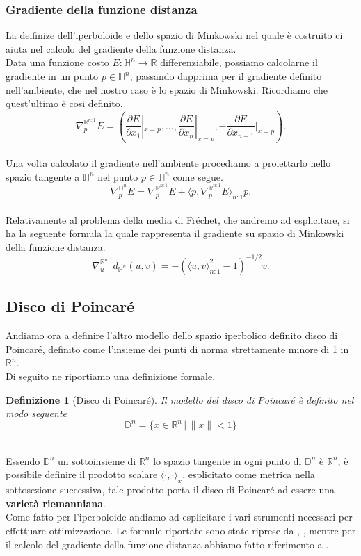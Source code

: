 \documentclass[a4paper, 12pt]{article}
\newtheorem{definition}{Definizione}
\begin{document}
\subsubsection{Gradiente della funzione distanza}
La deifinize dell'iperboloide e dello spazio di Minkowski nel quale è costruito ci aiuta nel calcolo del gradiente della funzione distanza.\\
Data una funzione costo $E:\mathbb{H}^n \to \mathbb{R}$ differenziabile, possiamo calcolarne il gradiente in un punto $p \in \mathbb{H}^n$, passando dapprima per il gradiente definito nell'ambiente, che nel nostro caso è lo spazio di Minkowski. Ricordiamo che quest'ultimo è cosi definito.\\
\[\nabla_{p}^{\mathbb{R}^{n:1}} E = \left (\frac{\partial E}{\partial x_1}|_{x=p}, ..., \frac{\partial E}{\partial x_n}|_{x=p}, -\frac{\partial E}{\partial x_{n+1}}|_{x=p} \right).\]\\
Una volta calcolato il gradiente nell'ambiente procediamo a proiettarlo nello spazio tangente a $\mathbb{H}^n$ nel punto $p \in \mathbb{H}^n$ come segue.\\
\[\nabla_{p}^{\mathbb{H}^n} E = \nabla_{p}^{\mathbb{R}^{n:1}} E + \langle p, \nabla_{p}^{\mathbb{R}^{n:1}} E \rangle_{n:1} p.\]\\
Relativamente al problema della media di Fréchet, che andremo ad esplicitare, si ha la seguente formula la quale rappresenta il gradiente su spazio di Minkowski della funzione distanza.\\
\[\nabla_u^{\mathbb{R}^{n:1}} d_{\mathbb{H}^n}(u,v) = - (\langle u,v \rangle_{n:1}^2 - 1)^{-1/2} v.\]
\subsection{Disco di Poincaré}
Andiamo ora a definire l'altro modello dello spazio iperbolico definito disco di Poincaré, definito come l'insieme dei punti di norma strettamente minore di 1 in $\mathbb{R}^n$.\\
Di seguito ne riportiamo una definizione formale.\\
\begin{definition}[Disco di Poincaré]
Il modello del disco di Poincaré è definito nel modo seguente\\
\[ \mathbb{D}^n = \{x \in \mathbb{R}^n \, | \, \| x \| < 1\} \]\\
\end{definition}
Essendo $\mathbb{D}^n$ un sottoinsieme di $\mathbb{R}^n$ lo spazio tangente in ogni punto di $\mathbb{D}^n$ è $\mathbb{R}^n$, è possibile definire il prodotto scalare $\langle \cdot, \cdot \rangle_x$, esplicitato come metrica nella sottosezione successiva, tale prodotto porta il disco di Poincaré ad essere una \textbf{varietà riemanniana}.\\
Come fatto per l'iperboloide andiamo ad esplicitare i vari strumenti necessari per effettuare ottimizzazione. Le formule riportate sono state riprese da \cite{GeoOpt}, \cite{Ganea}, mentre per il calcolo del gradiente della funzione distanza abbiamo fatto riferimento a \cite{Nickel}.
\end{document}

